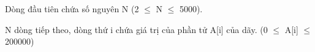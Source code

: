 Dòng đầu tiên chứa số nguyên N (2  $\le$  N  $\le$  5000).  

   N dòng tiếp theo, dòng thứ i chứa giá trị của phần tử A[i] của dãy. (0  $\le$  A[i]  $\le$  200000)  

\